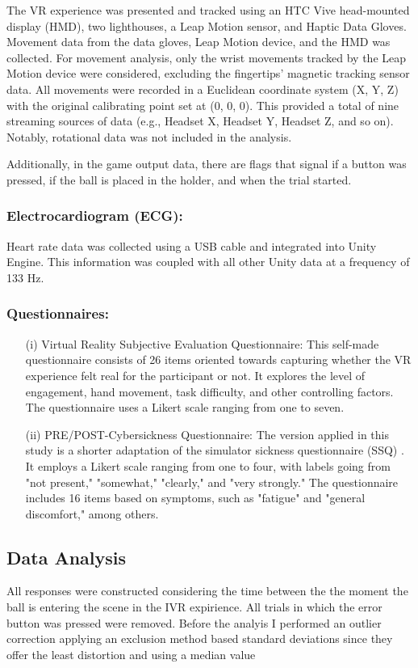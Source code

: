\documentclass[12pt,oneside,openright]{report}
\begin{document}
The VR experience was presented and tracked using an HTC Vive head-mounted display (HMD), two lighthouses, a Leap Motion sensor, and Haptic Data Gloves. Movement data from the data gloves, Leap Motion device, and the HMD was collected. For movement analysis, only the wrist movements tracked by the Leap Motion device were considered, excluding the fingertips' magnetic tracking sensor data. All movements were recorded in a Euclidean coordinate system (X, Y, Z) with the original calibrating point set at (0, 0, 0). This provided a total of nine streaming sources of data (e.g., Headset X, Headset Y, Headset Z, and so on). Notably, rotational data was not included in the analysis.

Additionally, in the game output data, there are flags that signal if a button was pressed, if the ball is placed in the holder, and when the trial started.

\subsubsection*{Electrocardiogram (ECG):}

Heart rate data was collected using a USB cable and integrated into Unity Engine. This information was coupled with all other Unity data at a frequency of 133 Hz.

\subsubsection*{Questionnaires:}

\begin{enumerate}
\item[(i)] Virtual Reality Subjective Evaluation Questionnaire: This self-made questionnaire consists of 26 items oriented towards capturing whether the VR experience felt real for the participant or not. It explores the level of engagement, hand movement, task difficulty, and other controlling factors. The questionnaire uses a Likert scale ranging from one to seven.
\item[(ii)] PRE/POST-Cybersickness Questionnaire: The version applied in this study is a shorter adaptation of the simulator sickness questionnaire (SSQ) \parencite*{avpsy}. It employs a Likert scale ranging from one to four, with labels going from "not present," "somewhat," "clearly," and "very strongly." The questionnaire includes 16 items based on symptoms, such as "fatigue" and "general discomfort," among others.
\end{enumerate}
    \subsection*{Data Analysis}
    All responses were constructed considering the time between the the moment the ball is entering the scene in the IVR expirience. All trials in which the error button was pressed were removed. Before the analyis I performed an outlier correction applying an exclusion method based standard deviations since they offer the least distortion and using a median value  
\end{document}
